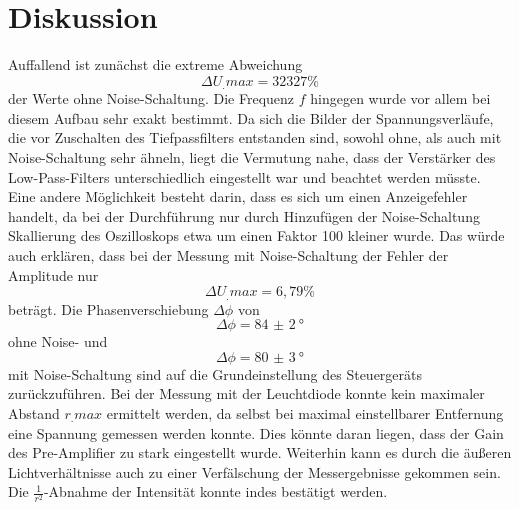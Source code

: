 \section{Diskussion}
\label{sec:Diskussion}
Auffallend ist zunächst die extreme Abweichung
\[
\Delta U_.{max}=32327\%
\]
der Werte ohne Noise-Schaltung.
Die Frequenz $f$ hingegen wurde vor allem bei diesem Aufbau sehr exakt bestimmt.
Da sich die Bilder der Spannungsverläufe, die vor Zuschalten des Tiefpassfilters entstanden sind, sowohl ohne, als auch mit Noise-Schaltung sehr ähneln, liegt die Vermutung nahe, dass der Verstärker des Low-Pass-Filters unterschiedlich eingestellt war und beachtet werden müsste.
Eine andere Möglichkeit besteht darin, dass es sich um einen Anzeigefehler handelt, da bei der Durchführung nur durch Hinzufügen der Noise-Schaltung Skallierung des Oszilloskops etwa um einen Faktor 100 kleiner wurde.
Das würde auch erklären, dass bei der Messung mit Noise-Schaltung der Fehler der Amplitude nur
\[
\Delta U_.{max}= 6,79\%
\]
beträgt.
Die Phasenverschiebung $\Delta\phi$ von
\[
\Delta\phi = \SI{84(2)}{\degree}
\]
ohne Noise- und
\[
\Delta\phi = \SI{80(3)}{\degree}
\]
mit Noise-Schaltung sind auf die Grundeinstellung des Steuergeräts zurückzuführen.
Bei der Messung mit der Leuchtdiode konnte kein maximaler Abstand $r_.{max}$ ermittelt werden, da selbst bei maximal einstellbarer Entfernung eine Spannung gemessen werden konnte.
Dies könnte daran liegen, dass der Gain des Pre-Amplifier zu stark eingestellt wurde.
Weiterhin kann es durch die äußeren Lichtverhältnisse auch zu einer Verfälschung der Messergebnisse gekommen sein. Die $\frac{1}{r^2}$-Abnahme der Intensität konnte indes bestätigt werden.